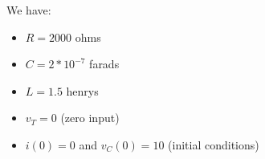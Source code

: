 \documentclass[preview]{standalone}
\begin{document}
\begin{center}
\raggedright
                We have: 
                \begin{itemize}
                  \item $R = 2000$ ohms
                  \item $C = 2 * 10^{-7}$  farads
                  \item $L = 1.5$ henrys
                  \item $v_T = 0$ (zero input)
                  \item $i(0) = 0$ and $v_C(0) = 10$ (initial conditions)
                \end{itemize}
\end{center}
\end{document}
